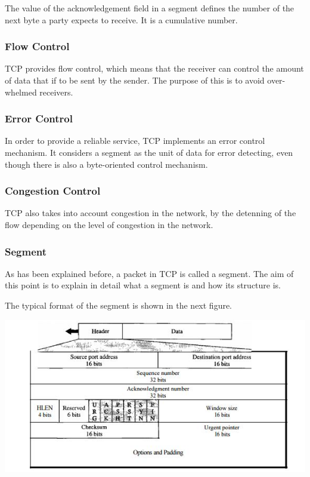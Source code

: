 The value of the acknowledgement field in a segment defines the number of the next byte a party expects to receive. It is a cumulative number. 

\subsubsection*{Flow Control}
TCP provides flow control, which means that the receiver can control the amount of data that if to be sent by the sender. The purpose of this is to avoid over-whelmed receivers. 

\subsubsection*{Error Control}
In order to provide a reliable service, TCP implements an error control mechanism. It considers a segment as the unit of data for error detecting, even though there is also a byte-oriented control mechanism. 

\subsubsection*{Congestion Control}
TCP also takes into account congestion in the network, by the detenning of the flow depending on the level of congestion in the network.





\subsubsection*{Segment}
As has been explained before, a packet in TCP is called a segment. The aim of this point is to explain in detail what a segment is and how its structure is.

The typical format of the segment is shown in the next figure. 


\includegraphics{TCP2}

